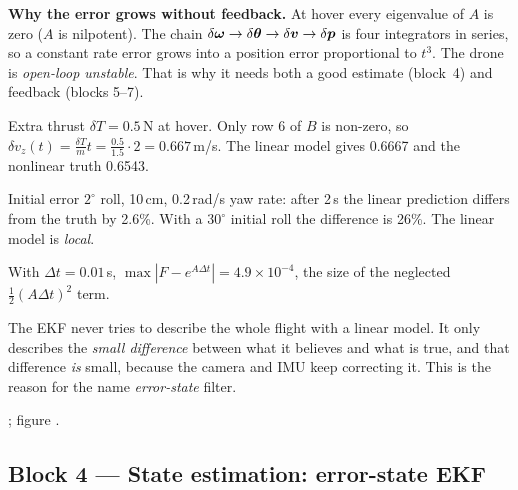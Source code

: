 \textbf{Why the error grows without feedback.} At hover every eigenvalue of $A$ is zero ($A$ is nilpotent).
The chain $\delta\bm{\omega}\to\delta\bm{\theta}\to\delta\bm{v}\to\delta\bm{p}$ is four integrators in series, so a constant rate error
grows into a position error proportional to $t^3$. The drone is \emph{open-loop unstable}. That is why it needs both a
good estimate (block~4) and feedback (blocks 5--7).

\begin{toybox}
Extra thrust $\delta T=0.5$\,N at hover. Only row 6 of $B$ is non-zero, so
$\delta v_z(t)=\frac{\delta T}{m}t=\frac{0.5}{1.5}\cdot2=0.667$\,m/s. The linear model gives 0.6667 and the nonlinear
truth 0.6543.

Initial error $2^\circ$ roll, 10\,cm, 0.2\,rad/s yaw rate: after 2\,s the linear prediction differs from the truth by
2.6\%. With a $30^\circ$ initial roll the difference is 26\%. The linear model is \emph{local}.

With $\Delta t=0.01$\,s, $\max|F-e^{A\Delta t}|=4.9\times10^{-4}$, the size of the neglected
$\tfrac12(A\Delta t)^2$ term.
\end{toybox}

\begin{projbox}
The EKF never tries to describe the whole flight with a linear model. It only describes the
\emph{small difference} between what it believes and what is true, and that difference \emph{is} small, because the
camera and IMU keep correcting it. This is the reason for the name \emph{error-state} filter.
\end{projbox}

\begin{codebox}
\intoy {}; figure .
\end{codebox}

\subsection{Block 4 --- State estimation: error-state EKF}
\label{sec:m1b4}

